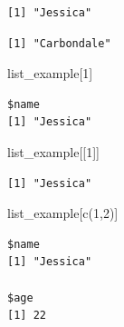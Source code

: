 \documentclass[
  letterpaper,
  DIV=11,
  numbers=noendperiod]{scrreprt}
\newenvironment{Shaded}{\begin{snugshade}}{\end{snugshade}}
\newcommand{\CommentTok}[1]{\textcolor[rgb]{0.37,0.37,0.37}{#1}}
\newcommand{\DecValTok}[1]{\textcolor[rgb]{0.68,0.00,0.00}{#1}}
\newcommand{\FunctionTok}[1]{\textcolor[rgb]{0.28,0.35,0.67}{#1}}
\newcommand{\NormalTok}[1]{\textcolor[rgb]{0.00,0.23,0.31}{#1}}
\newcommand{\SpecialCharTok}[1]{\textcolor[rgb]{0.37,0.37,0.37}{#1}}
\begin{document}
\begin{Shaded}
\end{Shaded}

\begin{verbatim}
[1] "Jessica"
\end{verbatim}

\begin{Shaded}
\end{Shaded}

\begin{verbatim}
[1] "Carbondale"
\end{verbatim}

\begin{Shaded}
\begin{Highlighting}[]
\NormalTok{list\_example[}\DecValTok{1}\NormalTok{]}
\end{Highlighting}
\end{Shaded}

\begin{verbatim}
$name
[1] "Jessica"
\end{verbatim}

\begin{Shaded}
\begin{Highlighting}[]
\NormalTok{list\_example[[}\DecValTok{1}\NormalTok{]]}
\end{Highlighting}
\end{Shaded}

\begin{verbatim}
[1] "Jessica"
\end{verbatim}

\begin{Shaded}
\begin{Highlighting}[]
\NormalTok{list\_example[}\FunctionTok{c}\NormalTok{(}\DecValTok{1}\NormalTok{,}\DecValTok{2}\NormalTok{)]}
\end{Highlighting}
\end{Shaded}

\begin{verbatim}
$name
[1] "Jessica"

$age
[1] 22
\end{verbatim}
\end{document}
